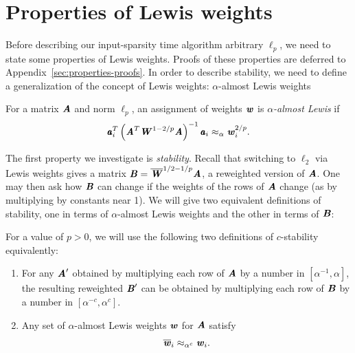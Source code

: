 
\section{Properties of Lewis weights}
\label{sec:properties}

Before describing our input-sparsity time algorithm arbitrary $\ell_p$,
we need to state some properties of Lewis weights.
Proofs of these properties are deferred to Appendix~\ref{sec:properties-proofs}.
In order to describe stability, we need to define a generalization of
the concept of Lewis weights: $\alpha$-almost Lewis weights

\begin{definition}
For a matrix $\AA$ and norm $\ell_p$, an assignment of weights $\ww$ is \emph{$\alpha$-almost Lewis} if
\begin{equation*}
\aa_i^T \left( \AA^T \WW^{1 - 2/p} \AA \right)^{-1} \aa_i \approx_{\alpha} \ww^{2/p}_i.
\end{equation*}
\end{definition}

The first property we investigate is \emph{stability}.  Recall that switching to $\ell_2$ via Lewis weights
gives a matrix $\BB = \WWbar^{1/2 - 1/p} \AA$, a reweighted version of $\AA$.  One may then ask how $\BB$ can change if the weights of the rows of $\AA$ change (as by multiplying by constants near 1).  We will give two equivalent definitions of stability, one in terms of $\alpha$-almost Lewis weights and the other in terms of $\BB$:

\begin{definition}
\label{def:stable}
For a value of $p > 0$, we will use the following two definitions of $c$-stability equivalently:
\begin{enumerate}
\item  For any $\AA'$ obtained by multiplying each row of $\AA$ by a number in
$[\alpha^{-1}, \alpha]$, the resulting reweighted $\BB'$ can be obtained by multiplying each row of
$\BB$ by a number in $[\alpha^{-c}, \alpha^c]$.
\label{def:stable1}
\item Any set of $\alpha$-almost Lewis weights $\ww$ for $\AA$ satisfy
\begin{equation*}
\wwbar_i \approx_{\alpha^c} \ww_i.
\end{equation*}
\label{def:stable2}
\end{enumerate}
\end{definition}

